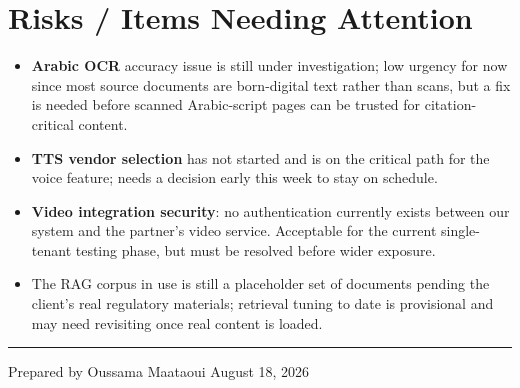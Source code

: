 \documentclass[11pt]{article}
\begin{document}
\section{Risks / Items Needing Attention}
\begin{itemize}
    \item \textbf{Arabic OCR} accuracy issue is still under investigation; low urgency for now since most source documents are born-digital text rather than scans, but a fix is needed before scanned Arabic-script pages can be trusted for citation-critical content.
    \item \textbf{TTS vendor selection} has not started and is on the critical path for the voice feature; needs a decision early this week to stay on schedule.
    \item \textbf{Video integration security}: no authentication currently exists between our system and the partner's video service. Acceptable for the current single-tenant testing phase, but must be resolved before wider exposure.
    \item The RAG corpus in use is still a placeholder set of documents pending the client's real regulatory materials; retrieval tuning to date is provisional and may need revisiting once real content is loaded.
\end{itemize}

\vspace{1em}
\hrule
\vspace{0.5em}
{\small\color{muted} Prepared by Oussama Maataoui \hfill August 18, 2026}
\end{document}
